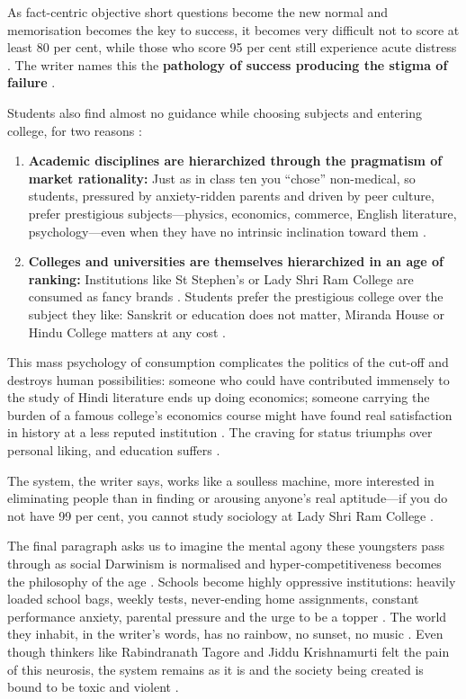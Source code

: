 As fact-centric objective short questions become the new normal and memorisation becomes the key to success, it becomes very difficult not to score at least 80 per cent, while those who score 95 per cent still experience acute distress . The writer names this the \textbf{pathology of success producing the stigma of failure} .

Students also find almost no guidance while choosing subjects and entering college, for two reasons :
\begin{enumerate}
    \item \textbf{Academic disciplines are hierarchized through the pragmatism of market rationality:} Just as in class ten you ``chose'' non-medical, so students, pressured by anxiety-ridden parents and driven by peer culture, prefer prestigious subjects---physics, economics, commerce, English literature, psychology---even when they have no intrinsic inclination toward them .
    \item \textbf{Colleges and universities are themselves hierarchized in an age of ranking:} Institutions like St Stephen's or Lady Shri Ram College are consumed as fancy brands . Students prefer the prestigious college over the subject they like: Sanskrit or education does not matter, Miranda House or Hindu College matters at any cost .
\end{enumerate}

This mass psychology of consumption complicates the politics of the cut-off and destroys human possibilities: someone who could have contributed immensely to the study of Hindi literature ends up doing economics; someone carrying the burden of a famous college's economics course might have found real satisfaction in history at a less reputed institution . The craving for status triumphs over personal liking, and education suffers .

The system, the writer says, works like a soulless machine, more interested in eliminating people than in finding or arousing anyone's real aptitude---if you do not have 99 per cent, you cannot study sociology at Lady Shri Ram College .

The final paragraph asks us to imagine the mental agony these youngsters pass through as social Darwinism is normalised and hyper-competitiveness becomes the philosophy of the age . Schools become highly oppressive institutions: heavily loaded school bags, weekly tests, never-ending home assignments, constant performance anxiety, parental pressure and the urge to be a topper . The world they inhabit, in the writer's words, has no rainbow, no sunset, no music . Even though thinkers like Rabindranath Tagore and Jiddu Krishnamurti felt the pain of this neurosis, the system remains as it is and the society being created is bound to be toxic and violent .

